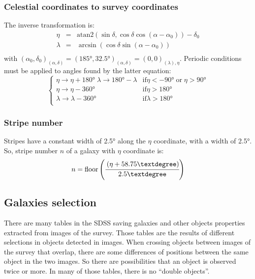 \subsubsection{Celestial coordinates to survey coordinates}
%
The inverse transformation is:
%
\begin{eqnarray}
    \eta &=& \mathrm{atan2}\left(\sin\delta,\cos\delta\cos\left(\alpha-\alpha_0\right)\right)-\delta_0\nonumber\\
    \lambda &=& \arcsin\left(\cos\delta\sin\left(\alpha-\alpha_0\right)\right)\nonumber\\
\end{eqnarray}
%
with
${(\alpha_0,\delta_0)}_{(\alpha,\delta)}={(185°,32.5°)}_{(\alpha,\delta)}={(0,0)}_{(\lambda),
\eta}$. Periodic conditions must be applied to angles found by the latter
equation:
%
\begin{equation}
    \begin{cases}
        \eta\rightarrow\eta+180° \; \lambda\rightarrow180°-\lambda&
        \mbox{if} \eta<-90°\;\mbox{or}\; \eta>90°\\
        \eta\rightarrow\eta-360° &
        \mbox{if} \eta>180°\\
        \lambda\rightarrow\lambda-360° &
        \mbox{if} \lambda>180°\\
    \end{cases}
\end{equation}
%
\subsubsection{Stripe number}
%
Stripes have a constant width of 2.5° along the $\eta$ coordinate, with a
width of 2.5°. So, stripe number $n$ of a galaxy with $\eta$ coordinate is:
%
\begin{equation}
    n = \mathrm{floor}\left(\cfrac{\left(\eta+58.75°\right)}{2.5°}\right)
\end{equation}
%
\subsection{Galaxies selection}
%
There are many tables in the SDSS saving galaxies and other objects properties
extracted from images of the survey. Those tables are the results of different
selections in objects detected in images. When crossing objects between images
of the survey that overlap, there are some differences of positions between the
same object in the two images. So there are possibilities that an object is
observed twice or more. In many of those tables, there is no ``double objects''.

